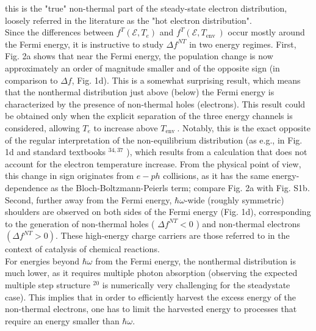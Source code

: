 \documentclass[10pt]{article}
\begin{document}
this is the "true" non-thermal part of the steady-state electron distribution, loosely referred in the literature as the "hot electron distribution".\\
Since the differences between $f^{T}\left(\mathcal{E}, T_{e}\right)$ and $f^{T}\left(\mathcal{E}, T_{\text {env }}\right)$ occur mostly around the Fermi energy, it is instructive to study $\Delta f^{N T}$ in two energy regimes. First, Fig. 2a shows that near the Fermi energy, the population change is now approximately an order of magnitude smaller and of the opposite sign (in comparison to $\Delta f$, Fig. 1d). This is a somewhat surprising result, which means that the nonthermal distribution just above (below) the Fermi energy is characterized by the presence of non-thermal holes (electrons). This result could be obtained only when the explicit separation of the three energy channels is considered, allowing $T_{e}$ to increase above $T_{\text {env }}$. Notably, this is the exact opposite of the regular interpretation of the non-equilibrium distribution (as e.g., in Fig. 1d and standard textbooks ${ }^{34,37}$ ), which results from a calculation that does not account for the electron temperature increase. From the physical point of view, this change in sign originates from $e-p h$ collisions, as it has the same energy-dependence as the Bloch-Boltzmann-Peierls term; compare Fig. 2a with Fig. S1b.\\
Second, further away from the Fermi energy, $\hbar \omega$-wide (roughly symmetric) shoulders are observed on both sides of the Fermi energy (Fig. 1d), corresponding to the generation of non-thermal holes ( $\Delta f^{N T}<0$ ) and non-thermal electrons $\left(\Delta f^{N T}>0\right)$. These high-energy charge carriers are those referred to in the context of catalysis of chemical reactions.\\
For energies beyond $\hbar \omega$ from the Fermi energy, the nonthermal distribution is much lower, as it requires multiple photon absorption (observing the expected multiple step structure ${ }^{20}$ is numerically very challenging for the steadystate case). This implies that in order to efficiently harvest the excess energy of the non-thermal electrons, one has to limit the harvested energy to processes that require an energy smaller than $\hbar \omega$.
\end{document}
